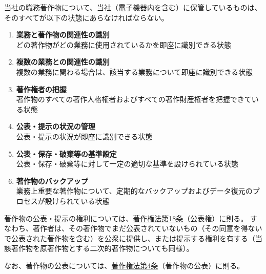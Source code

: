 \clearpage
当社の職務著作物について、当社（電子機器内を含む）に保管しているものは、そのすべてが以下の状態にあらなければならない。
\begin{enumerate}[label=\roman*)]
\item \textbf{業務と著作物の関連性の識別}\\
どの著作物がどの業務に使用されているかを即座に識別できる状態
\item \textbf{複数の業務との関連性の識別}\\
複数の業務に関わる場合は、該当する業務について即座に識別できる状態
\item \textbf{著作権者の把握}\\
著作物のすべての著作人格権者およびすべての著作財産権者を把握できている状態
\item \textbf{公表・提示の状況の管理}\\
公表・提示の状況が即座に識別できる状態
\item \textbf{公表・保存・破棄等の基準設定}\\
公表・保存・破棄等に対して一定の適切な基準を設けられている状態
\item \textbf{著作物のバックアップ}\\
業務上重要な著作物について、定期的なバックアップおよびデータ復元のプロセスが設けられている状態
\end{enumerate}



\clearpage
著作物の公表・提示の権利については、\href{https://elaws.e-gov.go.jp/document?lawid=345AC0000000048\#Mp-At_18}{著作権法第18条}（公表権）\cite{eGovCopyrightLaw}に則る。
すなわち、著作者は、その著作物でまだ公表されていないもの（その同意を得ないで公表された著作物を含む）を公衆に提供し、または提示する権利を有する（当該著作物を原著作物とする二次的著作物についても同様）。

なお、著作物の公表については、\href{https://elaws.e-gov.go.jp/document?lawid=345AC0000000048\#Mp-At_4}{著作権法第4条}（著作物の公表）\cite{eGovCopyrightLaw}に則る。


